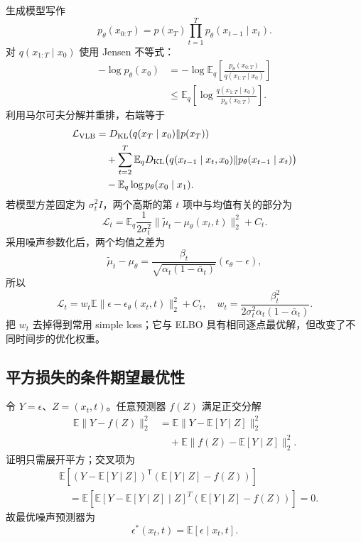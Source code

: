 \documentclass[11pt]{article}
\numberwithin{equation}{section}
\newcommand{\E}{\mathbb{E}}
\newcommand{\1}{\mathbf{1}}
\newcommand{\T}{\mathsf{T}}
\newcommand{\cL}{\mathcal{L}}
\begin{document}
生成模型写作
\begin{equation}
 p_\theta(x_{0:T})=p(x_T)\prod_{t=1}^{T}p_\theta(x_{t-1}\mid x_t).
\end{equation}
对 $q(x_{1:T}\mid x_0)$ 使用 Jensen 不等式：
\begin{align}
 -\log p_\theta(x_0)
 &=-\log\E_q\left[\frac{p_\theta(x_{0:T})}{q(x_{1:T}\mid x_0)}\right]\\
 &\le\E_q\left[\log\frac{q(x_{1:T}\mid x_0)}{p_\theta(x_{0:T})}\right].
\end{align}
利用马尔可夫分解并重排，右端等于
\begin{align}
 \cL_{\rm VLB}
 &=D_{\rm KL}(q(x_T\mid x_0)\|p(x_T))\\
 &\quad+\sum_{t=2}^{T}
 \E_qD_{\rm KL}\bigl(q(x_{t-1}\mid x_t,x_0)
 \|p_\theta(x_{t-1}\mid x_t)\bigr)\\
 &\quad-\E_q\log p_\theta(x_0\mid x_1).
\end{align}
若模型方差固定为 $\sigma_t^2I$，两个高斯的第 $t$ 项中与均值有关的部分为
\begin{equation}
 \cL_t=\E_q\frac1{2\sigma_t^2}
 \|\widetilde\mu_t-\mu_\theta(x_t,t)\|_2^2+C_t.
\end{equation}
采用噪声参数化后，两个均值之差为
\begin{equation}
 \widetilde\mu_t-\mu_\theta
 =\frac{\beta_t}{\sqrt{\alpha_t(1-\bar\alpha_t)}}
 (\epsilon_\theta-\epsilon),
\end{equation}
所以
\begin{equation}
 \cL_t=w_t\E\|\epsilon-\epsilon_\theta(x_t,t)\|_2^2+C_t,
 \quad
 w_t=\frac{\beta_t^2}{2\sigma_t^2\alpha_t(1-\bar\alpha_t)}.
\end{equation}
把 $w_t$ 去掉得到常用 simple loss；它与 ELBO 具有相同逐点最优解，但改变了不同时间步的优化权重。

\subsection{平方损失的条件期望最优性}

令 $Y=\epsilon$、$Z=(x_t,t)$。任意预测器 $f(Z)$ 满足正交分解
\begin{align}
 \E\|Y-f(Z)\|_2^2
 &=\E\|Y-\E[Y\mid Z]\|_2^2\\
 &\quad+\E\|f(Z)-\E[Y\mid Z]\|_2^2.
\end{align}
证明只需展开平方；交叉项为
\begin{align}
 &\E\left[(Y-\E[Y\mid Z])^\T
 (\E[Y\mid Z]-f(Z))\right]\\
 &\quad=\E\left[
 \E[Y-\E[Y\mid Z]\mid Z]^T
 (\E[Y\mid Z]-f(Z))\right]=0.
\end{align}
故最优噪声预测器为
\begin{equation}
 \epsilon^*(x_t,t)=\E[\epsilon\mid x_t,t].
\end{equation}
\end{document}
